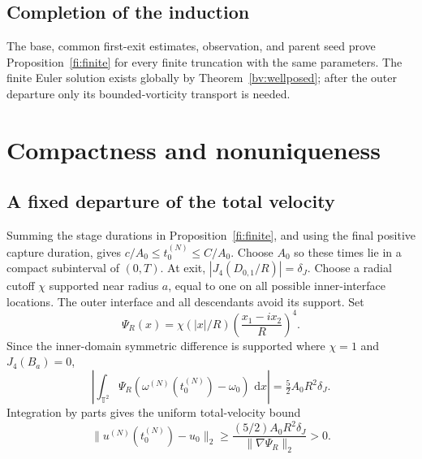 \documentclass[11pt]{amsart}
\theoremstyle{remark}
\numberwithin{equation}{section}
\newcommand{\T}{\mathbb T}
\newcommand{\dd}{\,\mathrm d}
\begin{document}
\subsection{Completion of the induction}
The base, common first-exit estimates, observation, and parent seed
prove Proposition~\ref{fi:finite} for every finite truncation with
the same parameters. The finite Euler solution exists globally
by Theorem~\ref{bv:wellposed}; after the outer departure only its
bounded-vorticity transport is needed.


\section{Compactness and nonuniqueness}\label{part:cp}
\subsection{A fixed departure of the total velocity}\label{cp:departure}
Summing the stage durations in Proposition~\ref{fi:finite}, and
using the final positive capture duration, gives
$c/A_0\le t_0^{(N)}\le C/A_0$. Choose $A_0$ so these times lie
in a compact subinterval of $(0,T)$.
At exit, $|J_4(D_{0,1}/R)|=\delta_J$.
Choose a radial cutoff $\chi$ supported near radius $a$, equal to
one on all possible inner-interface locations. The outer interface
and all descendants avoid its support. Set
\[
 \Psi_R(x)=\chi(|x|/R)\left(\frac{x_1-ix_2}{R}\right)^4.
\]
Since the inner-domain symmetric difference is supported where
$\chi=1$ and $J_4(B_a)=0$,
\[
 \left|\int_{\T^2}\Psi_R
       (\omega^{(N)}(t_0^{(N)})-\omega_0)\,\dd x\right|
       =\tfrac52A_0R^2\delta_J.
\]
Integration by parts gives the uniform total-velocity bound
\[
 \|u^{(N)}(t_0^{(N)})-u_0\|_2
       \ge\frac{(5/2)A_0R^2\delta_J}{\|\nabla\Psi_R\|_2}>0.
\]
\end{document}
